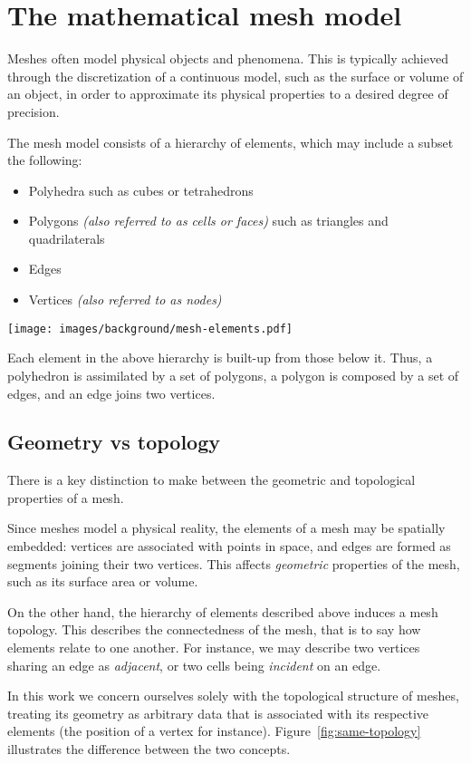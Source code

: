 \section{The mathematical mesh model}

Meshes often model physical objects and phenomena. This is typically achieved through the discretization of a continuous model, such as the surface or volume of an object, in order to approximate its physical properties to a desired degree of precision.
\par

The mesh model consists of a hierarchy of elements, which may include a subset the following:
\begin{itemize}
\item Polyhedra such as cubes or tetrahedrons
\item Polygons \emph{(also referred to as cells or faces)} such as triangles and quadrilaterals
\item Edges
\item Vertices \emph{(also referred to as nodes)}
\end{itemize}

\texttt{[image: images/background/mesh-elements.pdf]}

Each element in the above hierarchy is built-up from those below it. Thus, a polyhedron is assimilated by a set of polygons, a polygon is composed by a set of edges, and an edge joins two vertices.


\subsection{Geometry vs topology}
There is a key distinction to make between the geometric and topological properties of a mesh.

Since meshes model a physical reality, the elements of a mesh may be spatially embedded: vertices are associated with points in space, and edges are formed as segments joining their two vertices. This affects \emph{geometric} properties of the mesh, such as its surface area or volume.

On the other hand, the hierarchy of elements described above induces a mesh topology. This describes the connectedness of the mesh, that is to say how elements relate to one another. For instance, we may describe two vertices sharing an edge as \emph{adjacent}, or two cells being \emph{incident} on an edge.
\par
In this work we concern ourselves solely with the topological structure of meshes, treating its geometry as arbitrary data that is associated with its respective elements (the position of a vertex for instance). Figure~\ref{fig:same-topology} illustrates the difference between the two concepts.

